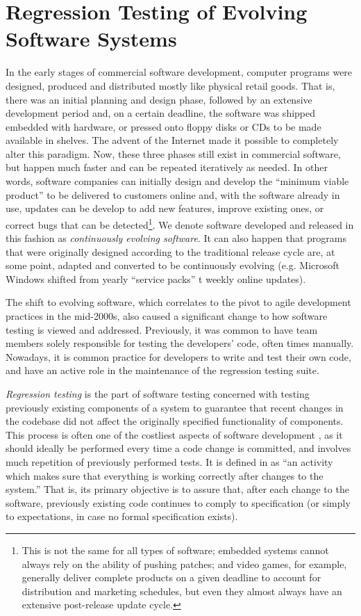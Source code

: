 \section{Regression Testing of Evolving Software Systems}
\label{sec:regression}

In the early stages of commercial software development, computer programs were designed, produced and distributed mostly like physical retail goods.
That is, there was an initial planning and design phase, followed by an extensive development period and, on a certain deadline, the software was shipped embedded with hardware, or pressed onto floppy disks or CDs to be made available in shelves.
The advent of the Internet made it possible to completely alter this paradigm.
Now, these three phases still exist in commercial software, but happen much faster and can be repeated iteratively as needed.
In other words, software companies can initially design and develop the ``minimum viable product'' to be delivered to customers online and, with the software already in use, updates can be develop to add new features, improve existing ones, or correct bugs that can be detected\footnote{This is not the same for all types of software; embedded systems cannot always rely on the ability of pushing patches; and video games, for example, generally deliver complete products on a given deadline to account for distribution and marketing schedules, but even they almost always have an extensive post-release update cycle.}.
We denote software developed and released in this fashion as \textit{continuously evolving software}.
It can also happen that programs that were originally designed according to the traditional release cycle are, at some point, adapted and converted to be continuously evolving (e.g. Microsoft Windows shifted from yearly ``service packs'' t weekly online updates).

The shift to evolving software, which correlates to the pivot to agile development practices in the mid-2000s, also caused a significant change to how software testing is viewed and addressed.
Previously, it was common to have team members solely responsible for testing the developers' code, often times manually.
Nowadays, it is common practice for developers to write and test their own code, and have an active role in the maintenance of the regression testing suite.

\textit{Regression testing} is the part of software testing concerned with testing previously existing components of a system to guarantee that recent changes in the codebase did not affect the originally specified functionality of components.
This process is often one of the costliest aspects of software development \cite{rothermel_improving_2018}, as it should ideally be performed every time a code change is committed, and involves much repetition of previously performed tests.
It is defined in \cite{minhas_regression_2017} as ``an activity which makes sure that everything is working correctly after changes to the system.''
That is, its primary objective is to assure that, after each change to the software, previously existing code continues to comply to specification (or simply to expectations, in case no formal specification exists).

